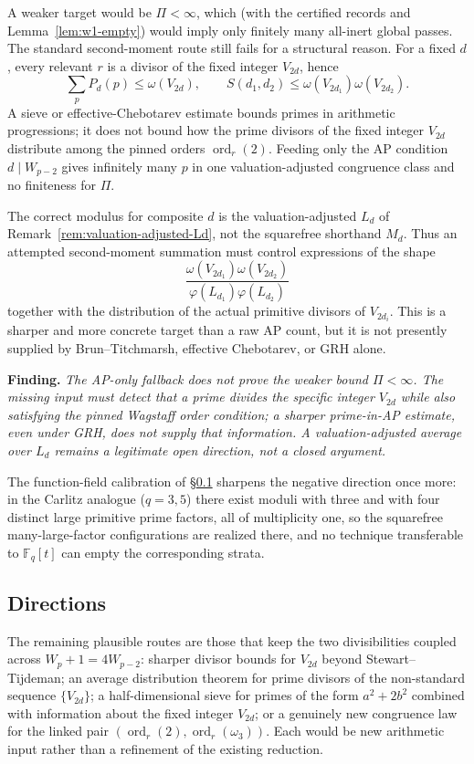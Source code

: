 \documentclass[11pt]{amsart}
\theoremstyle{plain}
\theoremstyle{definition}
\theoremstyle{remark}
\numberwithin{equation}{section}
\newcommand{\ord}{\operatorname{ord}}
\newcommand{\F}{\mathbb{F}}
\begin{document}
A weaker target would be $\Pi<\infty$, which (with the certified records and Lemma~\ref{lem:w1-empty}) would imply only finitely many all-inert global passes. The standard second-moment route still fails for a structural reason. For a fixed $d$, every relevant $r$ is a divisor of the fixed integer $V_{2d}$, hence
\[
  \sum_p P_d(p)\leq \omega(V_{2d}),\qquad
  S(d_1,d_2)\leq \omega(V_{2d_1})\omega(V_{2d_2}).
\]
A sieve or effective-Chebotarev estimate bounds primes in arithmetic progressions; it does not bound how the prime divisors of the fixed integer $V_{2d}$ distribute among the pinned orders $\ord_r(2)$. Feeding only the AP condition $d\mid W_{p-2}$ gives infinitely many $p$ in one valuation-adjusted congruence class and no finiteness for $\Pi$.

The correct modulus for composite $d$ is the valuation-adjusted $L_d$ of Remark~\ref{rem:valuation-adjusted-Ld}, not the squarefree shorthand $M_d$. Thus an attempted second-moment summation must control expressions of the shape
\[
  \frac{\omega(V_{2d_1})\omega(V_{2d_2})}
       {\varphi(L_{d_1})\varphi(L_{d_2})}
\]
together with the distribution of the actual primitive divisors of $V_{2d_i}$. This is a sharper and more concrete target than a raw AP count, but it is not presently supplied by Brun--Titchmarsh, effective Chebotarev, or GRH alone.

\medskip
\noindent\textbf{Finding.} \emph{The AP-only fallback does not prove the weaker bound $\Pi<\infty$. The missing input must detect that a prime divides the specific integer $V_{2d}$ while also satisfying the pinned Wagstaff order condition; a sharper prime-in-AP estimate, even under GRH, does not supply that information. A valuation-adjusted average over $L_d$ remains a legitimate open direction, not a closed argument.}
\medskip

The function-field calibration of \S\ref{sec:pppc-directions} sharpens the negative direction once more: in the Carlitz analogue ($q = 3, 5$) there exist moduli with three and with four distinct large primitive prime factors, all of multiplicity one, so the squarefree many-large-factor configurations are realized there, and no technique transferable to $\F_q[t]$ can empty the corresponding strata.

\subsection{Directions}\label{sec:pppc-directions}

The remaining plausible routes are those that keep the two divisibilities coupled across $W_p+1=4W_{p-2}$: sharper divisor bounds for $V_{2d}$ beyond Stewart--Tijdeman; an average distribution theorem for prime divisors of the non-standard sequence $\{V_{2d}\}$; a half-dimensional sieve for primes of the form $a^2+2b^2$ combined with information about the fixed integer $V_{2d}$; or a genuinely new congruence law for the linked pair $(\ord_r(2),\ord_r(\omega_3))$. Each would be new arithmetic input rather than a refinement of the existing reduction.
\end{document}
